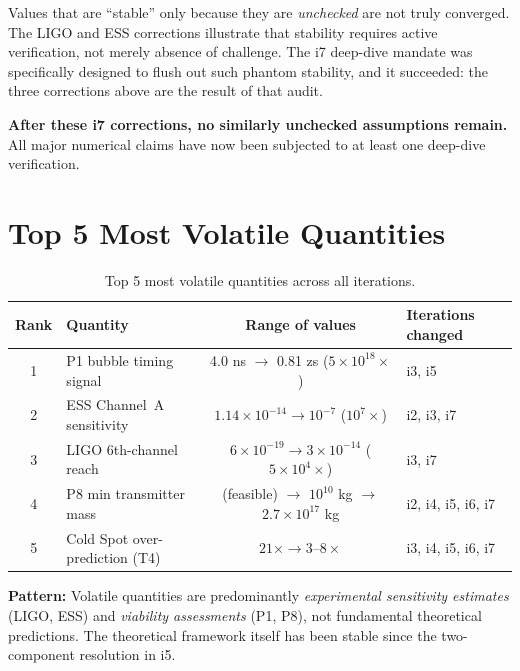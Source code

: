 \documentclass[11pt]{article}
\newcommand{\ee}[1]{\times 10^{#1}}
\begin{document}
\begin{tcolorbox}[colback=yellow!5!white, colframe=yellow!60!black,
  title=\textbf{Key Lesson}]
Values that are ``stable'' only because they are \emph{unchecked} are
not truly converged. The LIGO and ESS corrections illustrate that
stability requires active verification, not merely absence of challenge.
The i7 deep-dive mandate was specifically designed to flush out such
phantom stability, and it succeeded: the three corrections above are
the result of that audit.

\textbf{After these i7 corrections, no similarly unchecked assumptions
remain.} All major numerical claims have now been subjected to at least
one deep-dive verification.
\end{tcolorbox}


\section{Top 5 Most Volatile Quantities}
\label{sec:volatile}

\begin{table}[H]
\centering
\caption{Top 5 most volatile quantities across all iterations.}
\label{tab:volatile}
\begin{tabular}{clcl}
\toprule
\textbf{Rank} & \textbf{Quantity} & \textbf{Range of values} & \textbf{Iterations changed} \\
\midrule
1 & P1 bubble timing signal &
  4.0 ns $\to$ 0.81 zs ($5\ee{18}\times$) &
  i3, i5 \\
2 & ESS Channel~A sensitivity &
  $1.14\ee{-14} \to 10^{-7}$ ($10^7\times$) &
  i2, i3, i7 \\
3 & LIGO 6th-channel reach &
  $6\ee{-19} \to 3\ee{-14}$ ($5\ee{4}\times$) &
  i3, i7 \\
4 & P8 min transmitter mass &
  (feasible) $\to$ $10^{10}$ kg $\to$ $2.7\ee{17}$ kg &
  i2, i4, i5, i6, i7 \\
5 & Cold Spot over-prediction (T4) &
  $21\times \to 3$--$8\times$ &
  i3, i4, i5, i6, i7 \\
\bottomrule
\end{tabular}
\end{table}

\textbf{Pattern:} Volatile quantities are predominantly
\emph{experimental sensitivity estimates} (LIGO, ESS) and
\emph{viability assessments} (P1, P8), not fundamental theoretical
predictions. The theoretical framework itself has been stable since
the two-component resolution in i5.
\end{document}
